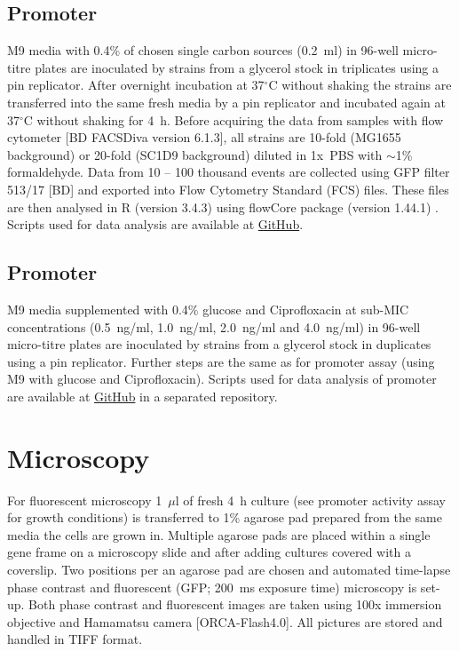 \subsection{Promoter }
M9 media with 0.4\% of chosen single carbon sources (0.2~ml) in 96-well micro-titre plates are inoculated by strains from a glycerol stock in triplicates using a pin replicator.
After overnight incubation at 37$^{\circ}$C without shaking the strains are transferred into the same fresh media by a pin replicator and incubated again at 37$^{\circ}$C without shaking for 4~h.
Before acquiring the data from samples with flow cytometer [BD FACSDiva version 6.1.3], all strains are 10-fold (MG1655 background) or 20-fold (SC1\textunderscore D9 background) diluted in 1x~PBS with $\sim$1\% formaldehyde.
Data from 10 -- 100 thousand events are collected using GFP filter 513/17 [BD] and exported into Flow Cytometry Standard (FCS) files.
These files are then analysed in R (version 3.4.3) using flowCore package (version 1.44.1) \cite{hahne2009flowcore}.
Scripts used for data analysis are available at \href{https://github.com/marketavlkova/LacZ_FC}{GitHub}.

\subsection{Promoter }
M9 media supplemented with 0.4\% glucose and Ciprofloxacin at sub-MIC concentrations (0.5~ng/ml, 1.0~ng/ml, 2.0~ng/ml and 4.0~ng/ml) in 96-well micro-titre plates are inoculated by strains from a glycerol stock in duplicates using a pin replicator.
Further steps are the same as for  promoter assay (using M9 with glucose and Ciprofloxacin).
Scripts used for data analysis of  promoter are available at \href{https://github.com/marketavlkova/RecA}{GitHub} in a separated repository.


\section{Microscopy}
For fluorescent microscopy 1~$\mu$l of fresh 4~h culture (see promoter activity assay for growth conditions) is transferred to 1\% agarose pad prepared from the same media the cells are grown in.
Multiple agarose pads are placed within a single gene frame on a microscopy slide and after adding cultures covered with a coverslip.
Two positions per an agarose pad are chosen and automated time-lapse phase contrast and fluorescent (GFP; 200~ms exposure time) microscopy is set-up.
Both phase contrast and fluorescent images are taken using 100x immersion objective and Hamamatsu camera [ORCA-Flash4.0].
All pictures are stored and handled in TIFF format.

\shorthandon{-}
